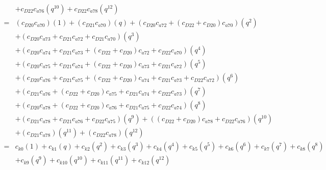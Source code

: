 \documentclass[12pt]{article}
\begin{document}
\begin{align}
    &+  c_{D22}c_{a76}(q^{10}) + c_{D22}c_{a78}(q^{12})  \\
    =& (c_{D20}c_{a70})(1) + (c_{D21}c_{a70})(q) + (c_{D20}c_{a72} + (c_{D22} + c_{D20})c_{a70})(q^2) \nonumber\\
    &+ (c_{D20}c_{a73} + c_{D21}c_{a72} + c_{D21}c_{a70})(q^3) \nonumber\\
    &+ (c_{D20}c_{a74} + c_{D21}c_{a73} + (c_{D22} + c_{D20})c_{a72} + c_{D22}c_{a70})(q^4) \nonumber\\
    &+ (c_{D20}c_{a75} + c_{D21}c_{a74} + (c_{D22} + c_{D20})c_{a73} + c_{D21}c_{a72})(q^5) \nonumber\\
    &+ (c_{D20}c_{a76} + c_{D21}c_{a75} + (c_{D22} + c_{D20})c_{a74} + c_{D21}c_{a73} + c_{D22}c_{a72})(q^6) \nonumber\\
    &+ (c_{D21}c_{a76} + (c_{D22} + c_{D20})c_{a75} + c_{D21}c_{a74} + c_{D22}c_{a73})(q^7) \nonumber\\
    &+ (c_{D20}c_{a78} + (c_{D22} + c_{D20})c_{a76} + c_{D21}c_{a75} +  c_{D22}c_{a74})(q^8) \nonumber\\
    &+ (c_{D21}c_{a78} + c_{D21}c_{a76} + c_{D22}c_{a75})(q^9) + ((c_{D22} + c_{D20})c_{a78} + c_{D22}c_{a76})(q^{10}) \nonumber\\
    &+ (c_{D21}c_{a78})(q^{11}) + (c_{D22}c_{a78})(q^{12}) \\
    =& c_{k0}(1) + c_{k1}(q) + c_{k2}(q^2) + c_{k3}(q^3) + c_{k4}(q^4) + c_{k5}(q^5) + c_{k6}(q^6) + c_{k7}(q^7) + c_{k8}(q^8) \nonumber\\
    &+ c_{k9}(q^9) + c_{k10}(q^{10}) + c_{k11}(q^{11}) + c_{k12}(q^{12})
\end{align}
\end{document}
